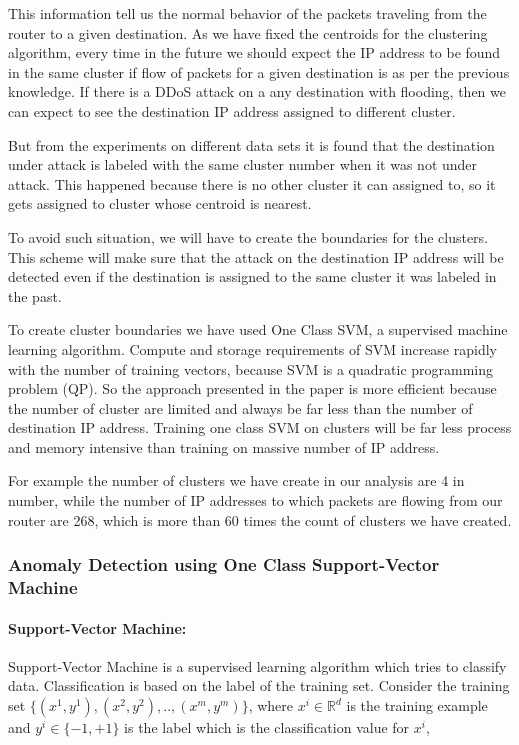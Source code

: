 \documentclass[12pt,oneside,a4paper]{article}
\begin{document}
This information tell us the normal behavior of the packets traveling from the router to a given destination. As we have fixed the centroids for the clustering algorithm, every time in the future we should expect the IP address to be found in the same cluster if flow of packets for a given destination is as per the previous knowledge. If there is a DDoS attack on a any destination with flooding, then we can expect to see the destination IP address assigned to different cluster.

But from the experiments on different data sets it is found that the destination under attack is labeled with the same cluster number when it was not under attack. This happened because there is no other cluster it can assigned to, so it gets assigned to cluster whose centroid is nearest.

To avoid such situation, we will have to create the boundaries for the clusters. This scheme will make sure that the attack on the destination IP address will be detected even if the destination is assigned to the same cluster it was labeled in the past.

To create cluster boundaries we have used One Class SVM, a supervised machine learning algorithm. Compute and storage requirements of SVM increase rapidly with the number of training vectors, because SVM is a quadratic programming problem (QP). So the approach presented in the paper is more efficient because the number of cluster are limited and always be far less than the number of destination IP address. Training one class SVM on clusters will be far less process and memory intensive than training on massive number of IP address.

For example the number of clusters we have create in our analysis are 4 in number, while the number of IP addresses to which packets are flowing from our router are 268, which is more than 60 times the count of clusters we have created.

\subsubsection{Anomaly Detection using One Class Support-Vector Machine}

\paragraph{Support-Vector Machine:}

Support-Vector Machine is a supervised learning algorithm which tries to classify data. Classification is based on the label of the training set. Consider the training set $\{(x^{1},y^{1}),(x^{2},y^{2}), .., (x^{m},y^{m})\}$, where $x^{i} \in \mathbb{R}^d$ is the training example and $y^{i} \in \{-1, +1\}$ is the label which is the classification value for $x^{i}$,
\end{document}
